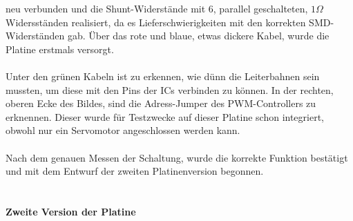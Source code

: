 \documentclass[titlepage,12pt,twoside]{article}
\begin{document}
neu verbunden und die Shunt-Widerstände mit 6, parallel geschalteten, $1\Omega$ Widersständen realisiert, da es Lieferschwierigkeiten mit den korrekten SMD-Widerständen gab. Über das rote und blaue, etwas dickere Kabel, wurde die Platine erstmals versorgt. \\
\\
Unter den grünen Kabeln ist zu erkennen, wie dünn die Leiterbahnen sein mussten, um diese mit den Pins der ICs verbinden zu können. In der rechten, oberen Ecke des Bildes, sind die Adress-Jumper des PWM-Controllers zu erknennen. Dieser wurde für Testzwecke 
auf dieser Platine schon integriert, obwohl nur ein Servomotor angeschlossen werden kann. \\
\\
Nach dem genauen Messen der Schaltung, wurde die korrekte Funktion bestätigt und mit dem Entwurf der zweiten Platinenversion begonnen. \\
\\

\paragraph{Zweite Version der Platine}
\hfill \break
\hfill \break
\end{document}
